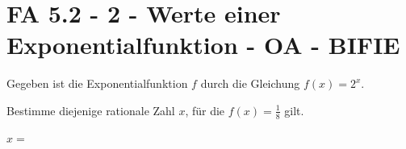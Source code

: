\section{FA 5.2 - 2 - Werte einer Exponentialfunktion - OA - BIFIE}

\begin{beispiel}[FA 5.2]{1} %
Gegeben ist die Exponentialfunktion $f$ durch die Gleichung $f(x)=2^x$.

\leer

Bestimme diejenige rationale Zahl $x$, für die $f(x)=\frac{1}{8}$ gilt.

\leer

$x=$\,
\end{beispiel}